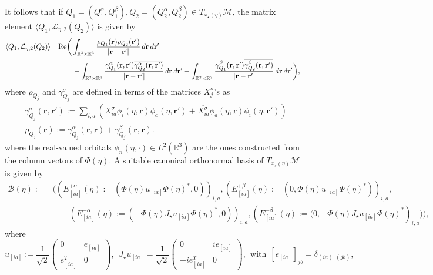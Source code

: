 \documentclass[11pt]{article}
\def\R{{\mathbb R}}
\begin{document}
It follows that if $Q_1=(Q_1^\alpha,Q_1^\beta),Q_2=(Q_2^\alpha,Q_2^\beta) \in T_{x_\star(\eta)}\mathcal M$, the matrix element $\langle Q_1, {\mathcal L}_{\eta,2}(Q_2) \rangle$ is given by
\begin{align*}
\langle Q_1, {\mathcal L}_{\eta,2}(Q_2) \rangle =& {\rm Re}\bigg( \int_{\R^3 \times \R^3} \frac{\rho_{Q_1}(\mathbf r) \rho_{Q_2}(\mathbf r')}{|\mathbf r-\mathbf r'|} \, d\mathbf r \, d\mathbf r' \\
& \qquad- \int_{\R^3 \times \R^3} \frac{\gamma_{Q_1}^\alpha(\mathbf r,\mathbf r') \overline{\gamma_{Q_2}^\alpha(\mathbf r,\mathbf r')}}{|\mathbf r-\mathbf r'|} \, d\mathbf r \, d\mathbf r' - \int_{\R^3 \times \R^3} \frac{\gamma_{Q_1}^\beta(\mathbf r,\mathbf r') \overline{\gamma_{Q_2}^\beta(\mathbf r,\mathbf r')}}{|\mathbf r-\mathbf r'|} \, d\mathbf r \, d\mathbf r'\bigg),
\end{align*}
where $\rho_{Q_j}$ and $\gamma_{Q_j}^\sigma$ are defined in terms of the matrices $X_j^\sigma$'s as 
\begin{align*}
& \gamma_{Q_j}^\sigma(\mathbf r,\mathbf r') := \sum_{i,a} \left( X_{ia}^\sigma \phi_i(\eta,\mathbf r) {\phi_a(\eta,\mathbf r')} + \overline{X_{ia}^\sigma} \phi_a(\eta,\mathbf r) {\phi_i(\eta,\mathbf r')} \right) \\
& \rho_{Q_j}(\mathbf r) := \gamma_{Q_j}^\alpha(\mathbf r,\mathbf r) + \gamma_{Q_j}^\beta(\mathbf r,\mathbf r).
\end{align*}
where the real-valued orbitals $\phi_n(\eta,\cdot) \in L^2(\R^3)$ are the ones constructed from the column vectors of $\Phi(\eta)$.
A suitable canonical orthonormal basis of $T_{x_\star(\eta)} \mathcal M$ is given by
\begin{align*}
\mathcal B(\eta):=& \bigg( \left(E_{[ia]}^{+\alpha}(\eta):=(\Phi(\eta) u_{[ia]}  \Phi(\eta)^* ,0) \right)_{i,a},  \left(E_{[ia]}^{+\beta}(\eta):=(0,\Phi(\eta) u_{[ia]} \Phi(\eta)^* )\right)_{i,a}, \\
& \qquad \left(E_{[ia]}^{-\alpha}(\eta):=(- \Phi(\eta) J_\star u_{[ia]} \Phi(\eta)^* ,0 )\right)_{i,a},  \left(E_{[ia]}^{-\beta}(\eta):=(0,-\Phi(\eta) J_\star u_{[ia]} \Phi(\eta)^* \right)_{i,a}) \bigg),
\end{align*}
where 
$$
u_{[ia]}:=\frac{1}{\sqrt{2}}\left( \begin{array}{cc} 0 & e_{[ia]} \\ e_{[ia]}^T & 0 \end{array} \right), ~~ J_{\star} u_{[ia]}
=\frac{1}{\sqrt{2}}\left( \begin{array}{cc} 0 & i e_{[ia]} \\ -i e_{[ia]}^T & 0 \end{array} \right), ~~ \mbox{with} ~~ [e_{[ia]}]_{jb} = \delta_{(ia),(jb)},
$$
\end{document}

